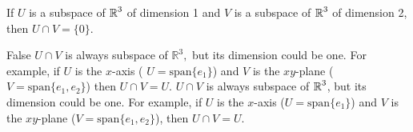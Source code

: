 \documentclass{ximera}
\begin{document}
\begin{exercise}  \label{A5.6.9}
If $U$ is a subspace of $\mbox{$\Bbb{R}$}^3$ of dimension 1 and $V$ is a subspace of $\mbox{$\Bbb{R}$}^3$ of dimension 2, then $U\cap V=\{0\}$.
\begin{solution}
\ans False 
\soln $U\cap V$ is always subspace of $\mathbb{R}^3,$ but its dimension could be one. For example, if $U$ is the $x$-axis ( $U=\text{span}\{e_1\}$) and $V$ is the $xy$-plane ($V=\text{span}\{e_1,e_2\}$) then $U\cap V=U.$
$U\cap V$ is always subspace of $\mbox{$\Bbb{R}$}^3$, but its dimension could be one. For example, if $U$ is the $x$-axis ($U=\text{span}\{e_1\}$) and $V$ is the $xy$-plane ($V=\text{span}\{e_1,e_2\}$), then $U\cap V=U$.
\end{solution}
\end{exercise}
\end{document}
